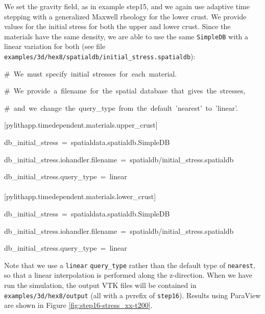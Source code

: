 We set the gravity field, as in example step15, and we again use adaptive
time stepping with a generalized Maxwell rheology for the lower crust.
We provide values for the initial stress for both the upper and lower
crust. Since the materials have the same density, we are able to use
the same \texttt{SimpleDB} with a linear variation for both (see file
\texttt{examples/3d/hex8/spatialdb/initial\_stress.spatialdb}):
\begin{lyxcode}
\#~We~must~specify~initial~stresses~for~each~material.

\#~We~provide~a~filename~for~the~spatial~database~that~gives~the~stresses,

\#~and~we~change~the~query\_type~from~the~default~'nearest'~to~'linear'.

{[}pylithapp.timedependent.materials.upper\_crust{]}

db\_initial\_stress~=~spatialdata.spatialdb.SimpleDB

db\_initial\_stress.iohandler.filename~=~spatialdb/initial\_stress.spatialdb

db\_initial\_stress.query\_type~=~linear~\\
~\\


{[}pylithapp.timedependent.materials.lower\_crust{]}

db\_initial\_stress~=~spatialdata.spatialdb.SimpleDB

db\_initial\_stress.iohandler.filename~=~spatialdb/initial\_stress.spatialdb

db\_initial\_stress.query\_type~=~linear
\end{lyxcode}
Note that we use a \texttt{linear} \texttt{query\_type} rather than
the default type of \texttt{nearest}, so that a linear interpolation
is performed along the z-direction. When we have run the simulation,
the output VTK files will be contained in \texttt{examples/3d/hex8/output}
(all with a pvrefix of \texttt{step16}). Results using ParaView are
shown in Figure \vref{fig:step16-stress_xx-t200}.

